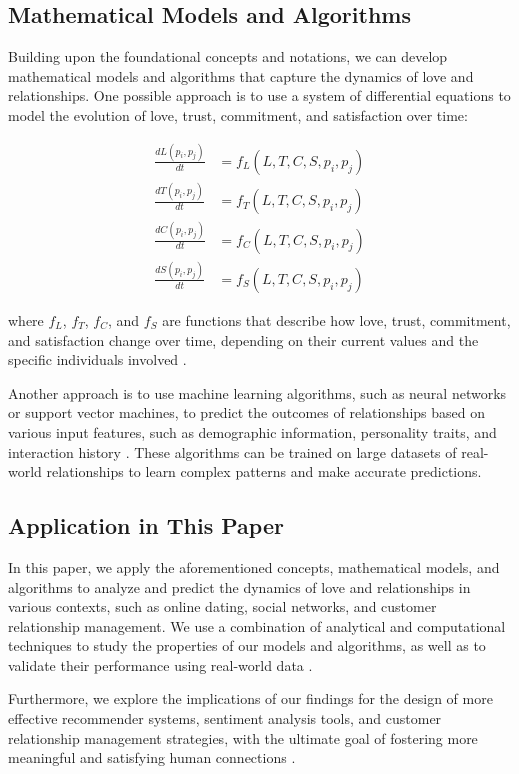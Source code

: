 \subsection{Mathematical Models and Algorithms}

Building upon the foundational concepts and notations, we can develop mathematical models and algorithms that capture the dynamics of love and relationships. One possible approach is to use a system of differential equations to model the evolution of love, trust, commitment, and satisfaction over time:

\begin{align}
    \frac{dL(p_i, p_j)}{dt} &= f_L(L, T, C, S, p_i, p_j) \\
    \frac{dT(p_i, p_j)}{dt} &= f_T(L, T, C, S, p_i, p_j) \\
    \frac{dC(p_i, p_j)}{dt} &= f_C(L, T, C, S, p_i, p_j) \\
    \frac{dS(p_i, p_j)}{dt} &= f_S(L, T, C, S, p_i, p_j)
\end{align}

where $f_L$, $f_T$, $f_C$, and $f_S$ are functions that describe how love, trust, commitment, and satisfaction change over time, depending on their current values and the specific individuals involved \citep{fredrickson2001the, dwyer1987developing}.

Another approach is to use machine learning algorithms, such as neural networks or support vector machines, to predict the outcomes of relationships based on various input features, such as demographic information, personality traits, and interaction history \citep{braun2006using, mitscherlich2020group}. These algorithms can be trained on large datasets of real-world relationships to learn complex patterns and make accurate predictions.

\subsection{Application in This Paper}

In this paper, we apply the aforementioned concepts, mathematical models, and algorithms to analyze and predict the dynamics of love and relationships in various contexts, such as online dating, social networks, and customer relationship management. We use a combination of analytical and computational techniques to study the properties of our models and algorithms, as well as to validate their performance using real-world data \citep{hoang2018flow, kazdin2021research}. 

Furthermore, we explore the implications of our findings for the design of more effective recommender systems, sentiment analysis tools, and customer relationship management strategies, with the ultimate goal of fostering more meaningful and satisfying human connections \citep{nagaychuk2021prompt, ms.2021microfinance}.
